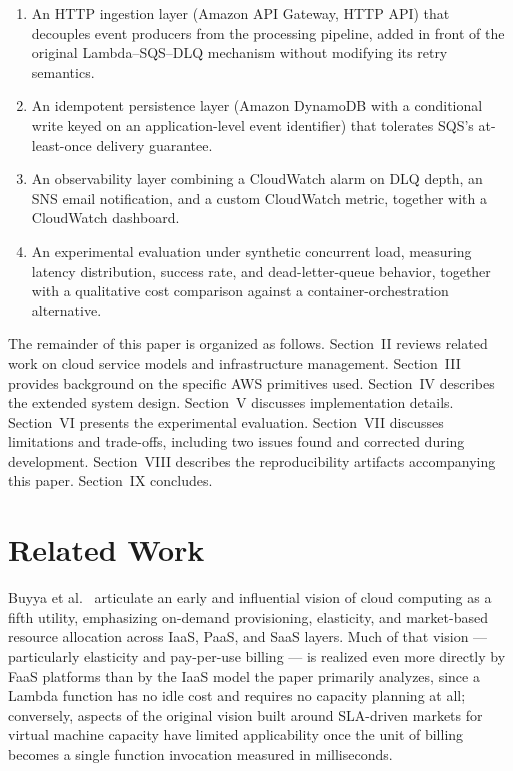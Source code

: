 \documentclass[conference]{IEEEtran}
\begin{document}
\begin{enumerate}
\item An HTTP ingestion layer (Amazon API Gateway, HTTP API) that decouples event producers from the processing pipeline, added in front of the original Lambda--SQS--DLQ mechanism without modifying its retry semantics.
\item An idempotent persistence layer (Amazon DynamoDB with a conditional write keyed on an application-level event identifier) that tolerates SQS's at-least-once delivery guarantee.
\item An observability layer combining a CloudWatch alarm on DLQ depth, an SNS email notification, and a custom CloudWatch metric, together with a CloudWatch dashboard.
\item An experimental evaluation under synthetic concurrent load, measuring latency distribution, success rate, and dead-letter-queue behavior, together with a qualitative cost comparison against a container-orchestration alternative.
\end{enumerate}

The remainder of this paper is organized as follows. Section~II reviews related work on cloud service models and infrastructure management. Section~III provides background on the specific AWS primitives used. Section~IV describes the extended system design. Section~V discusses implementation details. Section~VI presents the experimental evaluation. Section~VII discusses limitations and trade-offs, including two issues found and corrected during development. Section~VIII describes the reproducibility artifacts accompanying this paper. Section~IX concludes.

\section{Related Work}

Buyya et al.~\cite{buyya2009} articulate an early and influential vision of cloud computing as a fifth utility, emphasizing on-demand provisioning, elasticity, and market-based resource allocation across IaaS, PaaS, and SaaS layers. Much of that vision --- particularly elasticity and pay-per-use billing --- is realized even more directly by FaaS platforms than by the IaaS model the paper primarily analyzes, since a Lambda function has no idle cost and requires no capacity planning at all; conversely, aspects of the original vision built around SLA-driven markets for virtual machine capacity have limited applicability once the unit of billing becomes a single function invocation measured in milliseconds.
\end{document}
